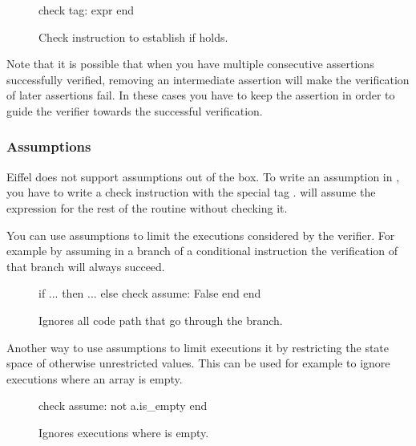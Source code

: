 \begin{figure}
\begin{erunning}[numbers=none]
check tag: expr end
\end{erunning}
\hspace{0.5cm}
\caption*{Check instruction to establish if  holds.}
\end{figure}

Note that it is possible that when you have multiple consecutive assertions successfully verified, removing an intermediate assertion will make the verification of later assertions fail. In these cases you have to keep the assertion in order to guide the verifier towards the successful verification.

\subsubsection*{Assumptions}

Eiffel does not support assumptions out of the box. To write an assumption in \AutoProof, you have to write a check instruction with the special tag . \AutoProof will assume the expression for the rest of the routine without checking it.

You can use assumptions to limit the executions considered by the verifier. For example by assuming  in a branch of a conditional instruction the verification of that branch will always succeed.

\begin{figure}
\begin{erunning}
if ... then
	...
else
	check assume: False end
end
\end{erunning}
\hspace{0.5cm}
\caption*{Ignores all code path that go through the  branch.}
\end{figure}

Another way to use assumptions to limit executions it by restricting the state space of otherwise unrestricted values. This can be used for example to ignore executions where an array is empty.

\begin{figure}
\begin{erunning}[numbers=none]
check assume: not a.is_empty end
\end{erunning}
\hspace{0.5cm}
\caption*{Ignores executions where  is empty.}
\end{figure}

